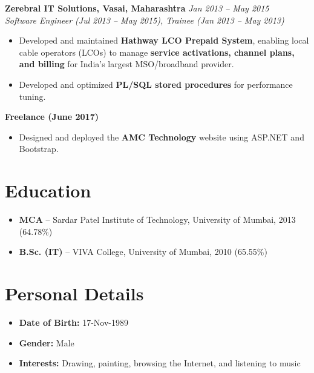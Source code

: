 \documentclass[12pt,a4paper]{article}
\begin{document}
\textbf{Zerebral IT Solutions, Vasai, Maharashtra} \hfill \textit{Jan 2013 -- May 2015}\\
\textit{Software Engineer (Jul 2013 -- May 2015), \newline Trainee (Jan 2013 -- May 2013)}
\begin{itemize}
    \item Developed and maintained \textbf{Hathway LCO Prepaid System}, enabling local cable operators (LCOs) to manage \textbf{service activations, channel plans, and billing} for India's largest MSO/broadband provider.
    \item Developed and optimized \textbf{PL/SQL stored procedures} for performance tuning.
\end{itemize}

\textbf{Freelance (June 2017)}
\begin{itemize}
    \item Designed and deployed the \textbf{AMC Technology} website using ASP.NET and Bootstrap.
\end{itemize}

\section*{Education}
\begin{itemize}
    \item \textbf{MCA} -- Sardar Patel Institute of Technology, University of Mumbai, 2013 \quad (64.78\%)
    \item \textbf{B.Sc. (IT)} -- VIVA College, University of Mumbai, 2010 \quad (65.55\%)
\end{itemize}

\section*{Personal Details}
\begin{itemize}
    \item \textbf{Date of Birth:} 17-Nov-1989
    \item \textbf{Gender:} Male
    \item \textbf{Interests:} Drawing, painting, browsing the Internet, and listening to music
\end{itemize}

\vspace{16pt}
\end{document}
